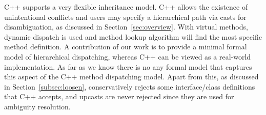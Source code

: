 \begin{comment} %
\noindent {\bf C++ model.}
C++ supports a very flexible inheritance model and allows programmers to choose either static dispatch or dynamic dispatch for method lookup.
It allows unintentional conflicts and uses static dispatch to resolve them, as discussed in Section~\ref{sec:overview}. For example, given the following code
\begin{lstlisting}[language=Java]
class A { public: void m() {cout << "MA" << endl;} };
class B { public: void m() {cout << "MB" << endl;} };
class C : public A, public B { 
	void m() {cout << "MC" << endl;}
};
void func(A* a) { a->m(); }
int main() {
	C* c = new C();
	c->B::m();
	func(c); 
	return 0; //Running result: MB MA
}
\end{lstlisting}
The running result is $MB \; MA$, meaning that it uses static dispatch (looks at the static types) for method \lstinline|m()|. 
On calling \texttt{func(c)}, in spite that the dynamic type of \texttt{c} is class \texttt{C}, the method call still dispatches to 
\lstinline|A.m|.
However, we can alter the code a little bit with \textbf{\texttt{virtual}} methods and the result will be totally different:
\begin{lstlisting}[language=c++]
class A { public: virtual void m() {cout << "MA" << endl;} };
class B { public: virtual void m() {cout << "MB" << endl;} };
class C : public A, public B { 
    public: virtual void m() {cout << "MC" << endl;}
};
void func(A* a) { a->m(); }
int main() {
	C* c = new C();
	c->B::m();
	func(c); 
	return 0; //Running result: MB MC
}
\end{lstlisting}
Now the running result will be $MB \; MC$. With virtual methods, dynamic dispatch is used and 
method lookup algorithm will find the most specific method definition of $m$, namely \lstinline|C.m| at this time.
Although C++ support this flexibility, dynamic dispatching on
unintentional conflicting methods is problematic, as discussed in
Section~\ref{sec:overview}.\bruno{where in the overview are we
  discussing this?}
Furthermore, compared to our
model, C++ does not support hierarchical overriding.
\end{comment}



C++ supports a very flexible inheritance model.
C++ allows the existence of unintentional conflicts and users may specify a hierarchical path via casts for disambiguation, as discussed in Section~\ref{sec:overview}. 
With virtual methods, dynamic dispatch is used and 
method lookup algorithm will find the most specific method definition.
A contribution of our work is to provide a minimal formal model of
hierarchical dispatching, whereas C++ can be viewed as a real-world
implementation. As far as we know there is no any formal model that
captures this aspect of the C++ method dispatching model. Apart from this, as discussed in Section~\ref{subsec:loosen}, \name{} conservatively rejects some interface/class definitions that C++ accepts, and upcasts are never rejected since they are used for ambiguity resolution.

